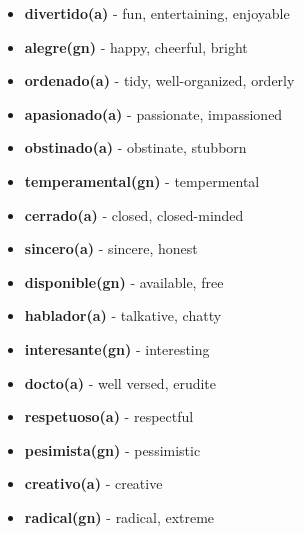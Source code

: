 \documentclass[12pt]{article}
\begin{document}
\begin{itemize}
            \item \textbf{divertido(a)} - fun, entertaining, enjoyable
            \item \textbf{alegre(gn)} - happy, cheerful, bright
            \item \textbf{ordenado(a)} - tidy, well-organized, orderly
            \item \textbf{apasionado(a)} - passionate, impassioned
            \item \textbf{obstinado(a)} - obstinate, stubborn
            \item \textbf{temperamental(gn)} - tempermental
            \item \textbf{cerrado(a)} - closed, closed-minded
            \item \textbf{sincero(a)} - sincere, honest
            \item \textbf{disponible(gn)} - available, free
            \item \textbf{hablador(a)} - talkative, chatty
            \item \textbf{interesante(gn)} - interesting
            \item \textbf{docto(a)} - well versed, erudite
            \item \textbf{respetuoso(a)} - respectful
            \item \textbf{pesimista(gn)} - pessimistic
            \item \textbf{creativo(a)} - creative
            \item \textbf{radical(gn)} - radical, extreme
        \end{itemize}
        
\end{document}
